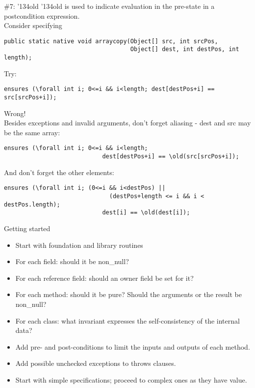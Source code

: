 \documentclass[
pdf,
nocolorBG,
slideColor,
cok,
]{prosper}
\newcommand{\bsl}{\char'134}
\newcommand{\old}{\bsl old}
\begin{document}
\begin{slide}{\#7: \old}
\vspace*{-6ex}
{\knalblue \old} is used to indicate evaluation in the pre-state in a postcondition expression.\\
\vspace{1ex}
Consider specifying
{\tiny
\begin{verbatim} 
public static native void arraycopy(Object[] src, int srcPos,
                                    Object[] dest, int destPos, int length);
\end{verbatim}
}
Try:
{\tiny
\begin{verbatim} 
ensures (\forall int i; 0<=i && i<length; dest[destPos+i] == src[srcPos+i]);
\end{verbatim}
}

{\red
Wrong!}\\
\vspace{1ex}
Besides exceptions and invalid arguments, don't forget aliasing - {\blue dest} and {\blue src} may be the same array:
{\tiny
\begin{verbatim} 
ensures (\forall int i; 0<=i && i<length; 
                            dest[destPos+i] == \old(src[srcPos+i]);
\end{verbatim}
}
And don't forget the other elements:
{\tiny
\begin{verbatim} 
ensures (\forall int i; (0<=i && i<destPos) || 
                              (destPos+length <= i && i < destPos.length); 
                            dest[i] == \old(dest[i]);
\end{verbatim}
}



\end{slide}



\begin{slide}{Getting started}
\vspace*{-6ex}
\begin{itemize}
\item Start with foundation and library routines
\item For each field: should it be {\knalblue non\_null}?
\item For each reference field: should an {\knalblue owner} field be set for it?
\item For each method: should it be {\knalblue pure}?  Should the arguments or the result be {\knalblue non\_null}?
\item For each class: what {\knalblue invariant} expresses the self-consistency of the internal data?
\item Add {\knalblue pre-} and {\knalblue post-conditions} to limit the inputs and outputs of each method.
\item Add possible unchecked {\knalblue exceptions} to throws clauses.
\item Start with simple specifications; proceed to complex ones as they have value.
\end{itemize}

\end{slide}
\end{document}
